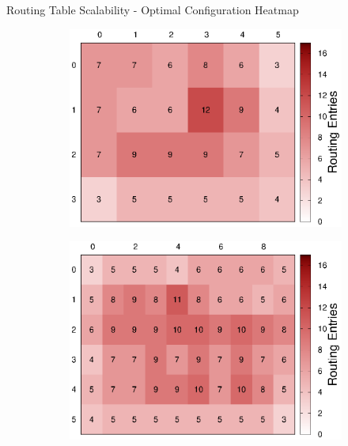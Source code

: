 \begin{frame}{Routing Table Scalability - Optimal Configuration Heatmap}
	\begin{center}
		\begin{figure}
			\begin{subfigure}{0.45\linewidth}
				\includegraphics[width=1.0\linewidth]{charts/synth1/synth1-routing-tables-heatmap-sla-off-optimal.eps}
			\end{subfigure}
			\begin{subfigure}{0.45\linewidth}
				\includegraphics[width=1.0\linewidth]{charts/synth2/synth2-routing-tables-heatmap-sla-off-optimal.eps}
			\end{subfigure}
			\begin{subfigure}{0.45\linewidth}

\end{subfigure}
\end{figure}
\end{center}
\end{frame}
